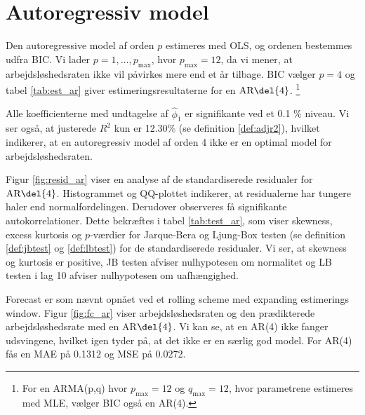 \section{Autoregressiv model}
Den autoregressive model af orden \(p\) estimeres med OLS, og ordenen bestemmes udfra BIC.
Vi lader $p = 1, \ldots, p_{\max}$, hvor \(p_\text{max}=12\), da vi mener, at arbejdsløshedsraten ikke vil påvirkes mere end et år tilbage.
BIC vælger \(p=4\) og tabel \ref{tab:est_ar} giver estimeringsresultaterne for en \(\text{AR} \del{4}\). \footnote{For en ARMA(p,q) hvor $p_{\max} = 12$ og $q_{\max} = 12$, hvor parametrene estimeres med MLE, vælger BIC også en AR(4).}
%


Alle koefficienterne med undtagelse af $\widehat\phi_1$ er signifikante ved et 0.1 \% niveau. 
Vi ser også, at justerede $R^2$ kun er 12.30\% (se definition \ref{def:adjr2}), hvilket indikerer, at en autoregressiv model af orden 4 ikke er en optimal model for arbejdsløshedsraten. 



Figur \ref{fig:resid_ar} viser en analyse af de standardiserede residualer for \(\text{AR} \del{4}\). 
Histogrammet og QQ-plottet indikerer, at residualerne har tungere haler end normalfordelingen. 
Derudover observeres få signifikante autokorrelationer.
Dette bekræftes i tabel \ref{tab:test_ar}, som viser skewness, excess kurtosis og \(p\)-værdier for Jarque-Bera og Ljung-Box testen (se definition \ref{def:jbtest} og \ref{def:lbtest}) for de standardiserede residualer. 
Vi ser, at skewness og kurtosis er positive, JB testen afviser nulhypotesen om normalitet og LB testen i lag 10 afviser nulhypotesen om uafhængighed.


Forecast er som nævnt opnået ved et rolling scheme med expanding estimerings window. 
Figur \ref{fig:fc_ar} viser arbejdsløshedsraten og den prædikterede arbejdsløshedsrate med en AR\(\del{4}\).
Vi kan se, at en AR(4) ikke fanger udsvingene, hvilket igen tyder på, at det ikke er en særlig god model. 
For AR(4) fås en MAE på 0.1312 og MSE på 0.0272.
%

\newpage